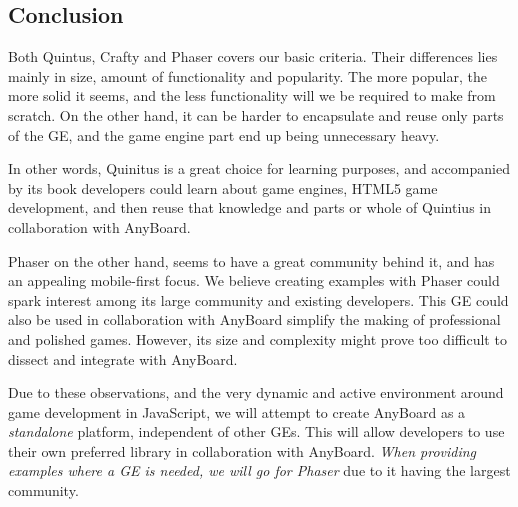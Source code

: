 \subsection{Conclusion}
Both Quintus, Crafty and Phaser covers our basic criteria. Their differences lies mainly in size, amount of functionality and popularity. The more popular, the more solid it seems, and the less functionality will we be required to make from scratch. On the other hand, it can be harder to encapsulate and reuse only parts of the GE, and the game engine part end up being unnecessary heavy.

In other words, Quinitus is a great choice for learning purposes, and accompanied by its book\cite{rettig2012professional} developers could learn about game engines, HTML5 game development, and then reuse that knowledge and parts or whole of Quintius in collaboration with AnyBoard.

Phaser on the other hand, seems to have a great community behind it, and has an appealing mobile-first focus. We believe creating examples with Phaser could spark interest among its large community and existing developers. This GE could also be used in collaboration with AnyBoard simplify the making of professional and polished games. However, its size and complexity might prove too difficult to dissect and integrate with AnyBoard.

Due to these observations, and the very dynamic and active environment around game development in JavaScript, we will attempt to create AnyBoard as a \emph{standalone} platform, independent of other GEs. This will allow developers to use their own preferred library in collaboration with AnyBoard. \emph{When providing examples where a GE is needed, we will go for Phaser} due to it having the largest community.
